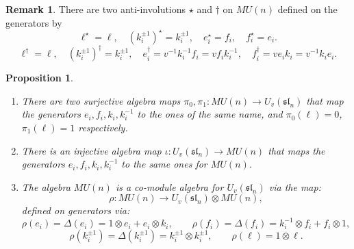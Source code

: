\documentclass{amsart}
\numberwithin{equation}{section}
\theoremstyle{theorem}
\newtheorem{proposition}[theorem]{Proposition}
\theoremstyle{definition}
\newtheorem{remark}[theorem]{Remark}
\newcommand{\sll}{\mathfrak{sl}}
\newcommand{\ra}{\rightarrow}
\newcommand{\uvsln}{U_v(\sll_n)}
\begin{document}
\begin{remark}\label{rem:anti-inv}
There are two anti-involutions $\star$ and $\dagger$ on $MU(n)$ defined on the generators by 
\[\ell^\star=\ell,\quad (k_i^{\pm 1})^\star=k_i^{\pm 1},\quad e_i^\star=f_i,\quad f_i^\star=e_i.\]
\[\ell^\dagger=\ell,\quad (k_i^{\pm 1})^\dagger=k_i^{\pm 1},\quad e_i^\dagger=v^{-1}k_i^{-1}f_i=vf_ik_i^{-1},\quad f_i^\dagger=ve_ik_i=v^{-1}k_ie_i.\]
\end{remark}
\begin{proposition}\label{prop:comodule-alg}
\begin{enumerate}
\item There are two surjective algebra maps $\pi_0,\pi_1:MU(n)\to \uvsln$ that map the generators $e_i, f_i, k_i, k_i^{-1}$ to the ones of the same name, and $\pi_0(\ell)=0$, $\pi_1(\ell)=1$ respectively.
\item There is an injective algebra map $\iota:\uvsln\to MU(n)$ that maps the generators $e_i, f_i, k_i, k_i^{-1}$ to the same ones for $MU(n)$. 
\item The algebra $MU(n)$ is a co-module algebra for $\uvsln$ via the map:
\[\rho: MU(n) \ra \uvsln\otimes MU(n) ,\]
defined on generators via:
\[\rho(e_i)=\Delta(e_i) = 1\otimes e_i + e_i\otimes k_i, \qquad \rho(f_i)=\Delta(f_i) = k_i^{-1}\otimes f_i + f_i\otimes 1,\]
\[\rho(k_i^{\pm1})=\Delta(k_i^{\pm 1}) = k_i^{\pm 1}\otimes k_i^{\pm 1}, \qquad \rho(\ell)=1\otimes \ell.\]
\end{enumerate}
\end{proposition}
\end{document}
